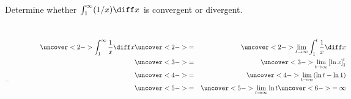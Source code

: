 \begin{frame}
\begin{example}[Example 1, p. 545]
Determine whether $\int_1^\infty (1/x) \diff x$ is convergent or divergent.
\begin{columns}[c]
\ \includegraphics[height=3cm]{improper-integrals/pictures/08-08-ex1b.pdf}%

%

\ %

%
\begin{eqnarray*}
\uncover<2->{%
\int_1^\infty \frac{1}{x}\diff x%
}%
& \uncover<2->{ = } & %
\uncover<2->{%
\lim_{t\rightarrow \infty} \int_1^t \frac{1}{x}\diff x%
}\\%
& \uncover<3->{ = } & %
\uncover<3->{%
\lim_{t\rightarrow \infty} \left[ \ln x\right]_1^t%
}\\%
& \uncover<4->{ = } & %
\uncover<4->{%
\lim_{t\rightarrow \infty} (\ln t - \ln 1)%
}\\%
& \uncover<5->{ = } & %
\uncover<5->{%
\lim_{t\rightarrow \infty} \ln t%
}%
\uncover<6->{ = \infty }%
\end{eqnarray*}
\end{columns}
\end{example}
\end{frame}

